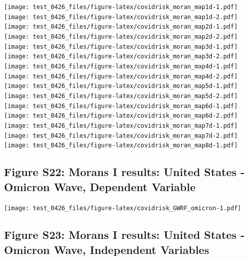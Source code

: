 \documentclass[
]{article}
\begin{document}
\texttt{[image: test\_0426\_files/figure-latex/covidrisk\_moran\_map1d-1.pdf]}
\texttt{[image: test\_0426\_files/figure-latex/covidrisk\_moran\_map1d-2.pdf]}
\newpage
\texttt{[image: test\_0426\_files/figure-latex/covidrisk\_moran\_map2d-1.pdf]}
\texttt{[image: test\_0426\_files/figure-latex/covidrisk\_moran\_map2d-2.pdf]}
\newpage
\texttt{[image: test\_0426\_files/figure-latex/covidrisk\_moran\_map3d-1.pdf]}
\texttt{[image: test\_0426\_files/figure-latex/covidrisk\_moran\_map3d-2.pdf]}
\newpage
\texttt{[image: test\_0426\_files/figure-latex/covidrisk\_moran\_map4d-1.pdf]}
\texttt{[image: test\_0426\_files/figure-latex/covidrisk\_moran\_map4d-2.pdf]}
\newpage
\texttt{[image: test\_0426\_files/figure-latex/covidrisk\_moran\_map5d-1.pdf]}
\texttt{[image: test\_0426\_files/figure-latex/covidrisk\_moran\_map5d-2.pdf]}
\newpage
\texttt{[image: test\_0426\_files/figure-latex/covidrisk\_moran\_map6d-1.pdf]}
\texttt{[image: test\_0426\_files/figure-latex/covidrisk\_moran\_map6d-2.pdf]}
\newpage
\texttt{[image: test\_0426\_files/figure-latex/covidrisk\_moran\_map7d-1.pdf]}
\texttt{[image: test\_0426\_files/figure-latex/covidrisk\_moran\_map7d-2.pdf]}
\newpage
\texttt{[image: test\_0426\_files/figure-latex/covidrisk\_moran\_map8d-1.pdf]}
\newpage

\hypertarget{figure-s22-morans-i-results-united-states---omicron-wave-dependent-variable}{%
\subsection{Figure S22: Morans I results: United States - Omicron Wave,
Dependent
Variable}\label{figure-s22-morans-i-results-united-states---omicron-wave-dependent-variable}}

\texttt{[image: test\_0426\_files/figure-latex/covidrisk\_GWRF\_omicron-1.pdf]}

\hypertarget{figure-s23-morans-i-results-united-states---omicron-wave-independent-variables}{%
\subsection{Figure S23: Morans I results: United States - Omicron Wave,
Independent
Variables}\label{figure-s23-morans-i-results-united-states---omicron-wave-independent-variables}}
\end{document}
